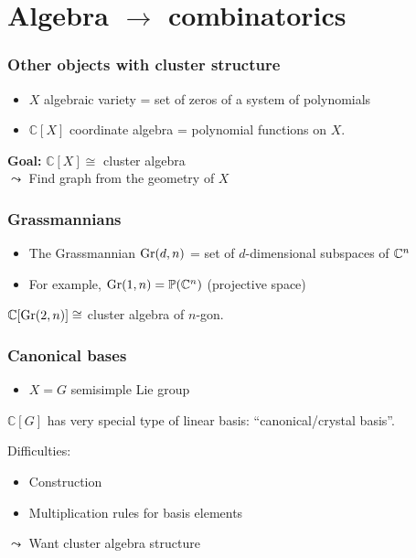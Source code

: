 \documentclass[aspectratio=169]{beamer}
\begin{document}
\section{Algebra $\to$ combinatorics}

\begin{frame}
	\frametitle{Other objects with cluster structure}

	\begin{itemize}
		\item $X$ algebraic variety = set of zeros of a system of polynomials
		      \pause
		\item $\mathbb{C}[X]$ coordinate algebra = polynomial functions on $X$.
	\end{itemize}
	\pause
	\textbf{Goal:} $\mathbb{C}[X] \cong$ cluster algebra
	\\
	$\leadsto$ Find graph from the geometry of $X$

\end{frame}

\begin{frame}
	\frametitle{Grassmannians}
	\begin{itemize}
		\item The Grassmannian $\operatorname{Gr}(d,n)$ = set of $d$-dimensional subspaces of $\mathbb{C}^n$
		\item For example, $\operatorname{Gr}(1, n) = \mathbb{P}(\mathbb{C}^n)$ (projective space)
	\end{itemize}
	\pause
	\begin{theorem}
		$\mathbb{C}[\operatorname{Gr}(2,n)] \cong $ cluster algebra of $n$-gon.
	\end{theorem}

\end{frame}

\begin{frame}
	\frametitle{Canonical bases}

	\begin{itemize}
		\item $X = G$ semisimple Lie group
	\end{itemize}
	\pause
	\begin{theorem}
		$\mathbb{C}[G]$ has very special type of linear basis: ``canonical/crystal basis''.
	\end{theorem}
	\pause
	Difficulties:
	\begin{itemize}
		\item Construction
		\item Multiplication rules for basis elements
	\end{itemize}
	\pause
	$\leadsto$ Want cluster algebra structure

\end{frame}
\end{document}
